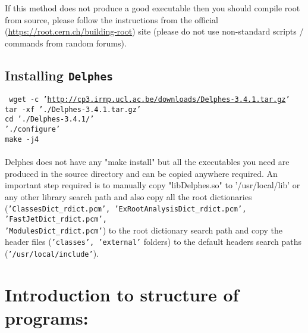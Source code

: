 If this method does not produce a good executable then you should compile root from source, please follow the instructions from the official (\url{https://root.cern.ch/building-root}) site (please do not use non-standard scripts / commands from random forums).

\subsection{Installing {\tt Delphes}}
{\tt
	wget -c '\url{http://cp3.irmp.ucl.ac.be/downloads/Delphes-3.4.1.tar.gz}'\\
	tar -xf './Delphes-3.4.1.tar.gz'\\
	cd './Delphes-3.4.1/'\\
	'./configure'\\
	make -j4\\	
}\\
Delphes does not have any "make install" but all the executables you need are produced in the source directory and can be copied anywhere required.
An important step required is to manually copy "libDelphes.so" to '/usr/local/lib' or any other library search path and also copy all the root dictionaries
({\tt 'ClassesDict\_rdict.pcm', 'ExRootAnalysisDict\_rdict.pcm', 'FastJetDict\_rdict.pcm',\\ 'ModulesDict\_rdict.pcm'}) to the root dictionary search path and copy the header files ({\tt 'classes', 'external'} folders) to the default headers search paths ({\tt '/usr/local/include'}).

\section{Introduction to structure of programs:}

